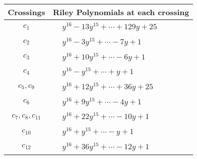 \documentclass[1p]{elsarticle_modified}
\theoremstyle{definition}
\begin{document}
\begin{tabular}{m{50pt}|m{274pt}}
Crossings & \hspace{64pt}Riley Polynomials at each crossing \\
\hline $$\begin{aligned}c_{1}\end{aligned}$$&$\begin{aligned}
&y^{16}-13 y^{15}+\cdots+129 y+25
\end{aligned}$\\
\hline $$\begin{aligned}c_{2}\end{aligned}$$&$\begin{aligned}
&y^{16}-3 y^{15}+\cdots-7 y+1
\end{aligned}$\\
\hline $$\begin{aligned}c_{3}\end{aligned}$$&$\begin{aligned}
&y^{16}+10 y^{15}+\cdots-6 y+1
\end{aligned}$\\
\hline $$\begin{aligned}c_{4}\end{aligned}$$&$\begin{aligned}
&y^{16}- y^{15}+\cdots+y+1
\end{aligned}$\\
\hline $$\begin{aligned}c_{5},c_{9}\end{aligned}$$&$\begin{aligned}
&y^{16}+12 y^{15}+\cdots+36 y+25
\end{aligned}$\\
\hline $$\begin{aligned}c_{6}\end{aligned}$$&$\begin{aligned}
&y^{16}+9 y^{15}+\cdots-4 y+1
\end{aligned}$\\
\hline $$\begin{aligned}c_{7},c_{8},c_{11}\end{aligned}$$&$\begin{aligned}
&y^{16}+22 y^{15}+\cdots-10 y+1
\end{aligned}$\\
\hline $$\begin{aligned}c_{10}\end{aligned}$$&$\begin{aligned}
&y^{16}+y^{15}+\cdots- y+1
\end{aligned}$\\
\hline $$\begin{aligned}c_{12}\end{aligned}$$&$\begin{aligned}
&y^{16}+36 y^{15}+\cdots-12 y+1
\end{aligned}$\\
\hline
\end{tabular}\\~\\
\end{document}
